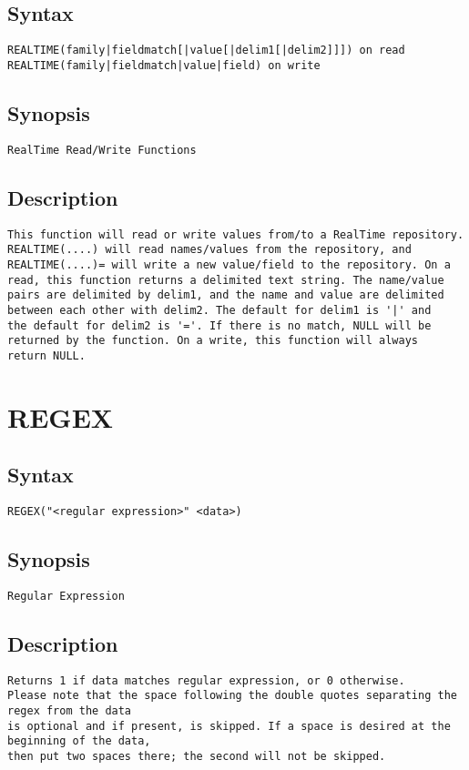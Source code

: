 \subsection{Syntax}
\begin{verbatim}
REALTIME(family|fieldmatch[|value[|delim1[|delim2]]]) on read
REALTIME(family|fieldmatch|value|field) on write

\end{verbatim}
\subsection{Synopsis}
\begin{verbatim}
RealTime Read/Write Functions
\end{verbatim}
\subsection{Description}
\begin{verbatim}
This function will read or write values from/to a RealTime repository.
REALTIME(....) will read names/values from the repository, and 
REALTIME(....)= will write a new value/field to the repository. On a
read, this function returns a delimited text string. The name/value 
pairs are delimited by delim1, and the name and value are delimited 
between each other with delim2. The default for delim1 is '|' and   
the default for delim2 is '='. If there is no match, NULL will be   
returned by the function. On a write, this function will always     
return NULL. 

\end{verbatim}


\section{REGEX}
\subsection{Syntax}
\begin{verbatim}
REGEX("<regular expression>" <data>)
\end{verbatim}
\subsection{Synopsis}
\begin{verbatim}
Regular Expression
\end{verbatim}
\subsection{Description}
\begin{verbatim}
Returns 1 if data matches regular expression, or 0 otherwise.
Please note that the space following the double quotes separating the regex from the data
is optional and if present, is skipped. If a space is desired at the beginning of the data,
then put two spaces there; the second will not be skipped.

\end{verbatim}


